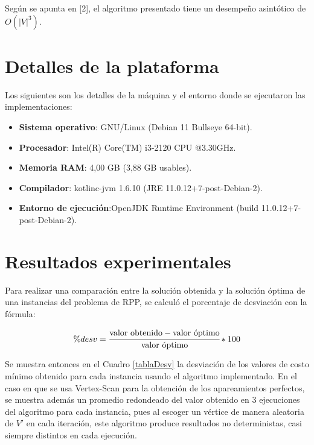 \documentclass[11pt]{article}
\begin{document}
Según se apunta en [2], el algoritmo presentado tiene un desempeño asintótico de
$O(|V|^3)$.

\section{Detalles de la plataforma}
Los siguientes son los detalles de la máquina y el entorno donde se ejecutaron las implementaciones:

\begin{itemize}
   \item \textbf{Sistema operativo}: GNU/Linux (Debian 11 Bullseye 64-bit).
   \item \textbf{Procesador}: Intel(R) Core(TM) i3-2120 CPU @3.30GHz.
   \item \textbf{Memoria RAM}: 4,00 GB (3,88 GB usables).
   \item \textbf{Compilador}: kotlinc-jvm 1.6.10 (JRE 11.0.12+7-post-Debian-2).
   \item \textbf{Entorno de ejecución}:OpenJDK Runtime Environment (build 11.0.12+7-post-Debian-2).
\end{itemize}

\section{Resultados experimentales}

Para realizar una comparación entre la solución obtenida y la solución óptima de una instancias
del problema de RPP, se calculó el porcentaje de desviación con la fórmula:

\begin{equation}
    \%desv = \cfrac{\text{valor obtenido} - \text{valor óptimo}}{\text{valor óptimo}} *100
\end{equation}

Se muestra entonces en el Cuadro \ref{tablaDesv} la desviación de los valores de 
costo mínimo obtenido para cada instancia usando el algoritmo implementado. En el 
caso en que se usa Vertex-Scan para la obtención de los apareamientos perfectos,
se muestra además un promedio redondeado del valor obtenido en 3 ejecuciones del
algoritmo para cada instancia, pues al escoger un vértice de manera aleatoria de
$V'$ en cada iteración, este algoritmo produce resultados no deterministas, casi
siempre distintos en cada ejecución. \\
\end{document}
